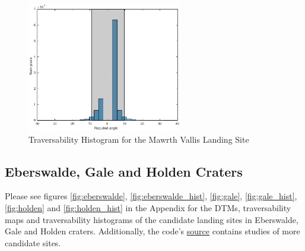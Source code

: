 \documentclass[12pt]{article}
\newcommand{\source}{\href{https://github.com/PapaCharlie/Rover-Climb-Angles/tree/master/figures/maps/}{\ttfamily\color{blue} \underline{source}}}
\begin{document}
\begin{figure}[h!]
  \centering
  \includegraphics[width=0.6\textwidth]{figures/maps/ESP_015985_2040/DTEEC_015985_2040_016262_2040_U01-hist.pdf}
  \caption{Traversability Histogram for the Mawrth Vallis Landing Site}
  \label{fig:mawrth_hist}
\end{figure}

\subsection{Eberswalde, Gale and Holden Craters}
Please see figures \ref{fig:eberswalde}, \ref{fig:eberswalde_hist}, \ref{fig:gale}, \ref{fig:gale_hist}, \ref{fig:holden} and \ref{fig:holden_hist} in the Appendix for the DTMs, traversability maps and traversability histograms of the candidate landing sites in Eberswalde, Gale and Holden craters. Additionally, the code's \source{} contains studies of more candidate sites.
\end{document}
